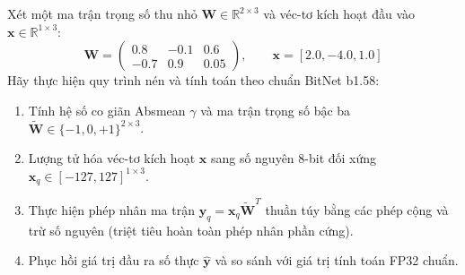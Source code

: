 \begin{example}
Xét một ma trận trọng số thu nhỏ $\mathbf{W} \in \mathbb{R}^{2 \times 3}$ và véc-tơ kích hoạt đầu vào $\mathbf{x} \in \mathbb{R}^{1 \times 3}$:
\begin{equation*}
\mathbf{W} = \begin{pmatrix} 0.8 & -0.1 & 0.6 \\ -0.7 & 0.9 & 0.05 \end{pmatrix}, \qquad \mathbf{x} = [2.0, -4.0, 1.0]
\end{equation*}
Hãy thực hiện quy trình nén và tính toán theo chuẩn BitNet b1.58:
\begin{enumerate}
  \item Tính hệ số co giãn Absmean $\gamma$ và ma trận trọng số bậc ba $\widetilde{\mathbf{W}} \in \{-1, 0, +1\}^{2 \times 3}$.
  \item Lượng tử hóa véc-tơ kích hoạt $\mathbf{x}$ sang số nguyên 8-bit đối xứng $\mathbf{x}_q \in [-127, 127]^{1 \times 3}$.
  \item Thực hiện phép nhân ma trận $\mathbf{y}_q = \mathbf{x}_q \widetilde{\mathbf{W}}^T$ thuần túy bằng các phép cộng và trừ số nguyên (triệt tiêu hoàn toàn phép nhân phần cứng).
  \item Phục hồi giá trị đầu ra số thực $\hat{\mathbf{y}}$ và so sánh với giá trị tính toán FP32 chuẩn.
\end{enumerate}
\end{example}

